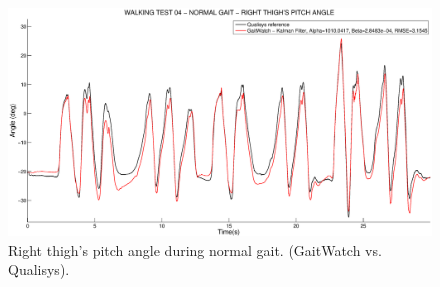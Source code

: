 \begin{figure}[H]
\centering
\includegraphics[width=1\textwidth]{figures/Walking_04_right_thigh.eps}
\caption{Right thigh's pitch angle during normal gait. (GaitWatch vs. Qualisys).}
\label{fig:Walking_04_right_thigh}
\end{figure}

